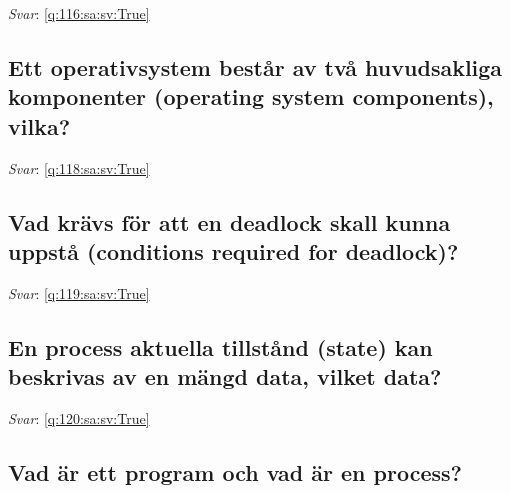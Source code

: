 \documentclass[a4paper,11pt,oneside]{article}
\begin{document}
\begin{sloppypar}
\textit{Svar}: \autoref{q:116:sa:sv:True}



\subsection{Ett operativsystem best\r{a}r av tv\r{a} huvudsakliga komponenter (operating system components), vilka?}

\label{q:118:sa:sv:False}

\vspace{2cm}

\noindent\makebox[\textwidth]{\hrulefill}

\vspace{1cm}

\textit{Svar}: \autoref{q:118:sa:sv:True}



\subsection{Vad kr\"avs f\"or att en deadlock skall kunna uppst\r{a} (conditions required for deadlock)?}

\label{q:119:sa:sv:False}

\vspace{2cm}

\noindent\makebox[\textwidth]{\hrulefill}

\vspace{1cm}

\textit{Svar}: \autoref{q:119:sa:sv:True}



\subsection{En process aktuella tillst\r{a}nd (state) kan beskrivas av en m\"angd data, vilket data?}

\label{q:120:sa:sv:False}

\vspace{2cm}

\noindent\makebox[\textwidth]{\hrulefill}

\vspace{1cm}

\textit{Svar}: \autoref{q:120:sa:sv:True}



\subsection{Vad \"ar ett program och vad \"ar en process?}


\end{sloppypar}
\end{document}
